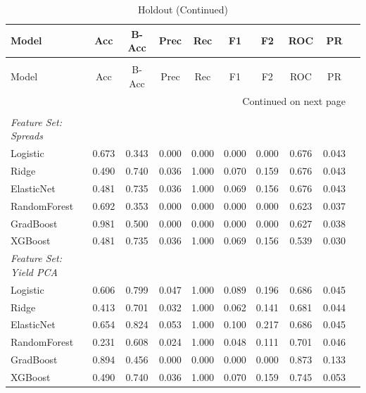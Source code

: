 \begin{longtable}{lccccccccc}
\caption{Holdout Performance} \label{tab:h} \\
\toprule
Model & Acc & B-Acc & Prec & Rec & F1 & F2 & ROC & PR \\
\midrule
\endfirsthead

\caption[]{Holdout (Continued)} \\
\toprule
Model & Acc & B-Acc & Prec & Rec & F1 & F2 & ROC & PR \\
\midrule
\endhead

\midrule
\multicolumn{9}{r}{Continued on next page} \\
\bottomrule
\endfoot
\bottomrule
\endlastfoot

\multicolumn{9}{l}{\textbf{Test Fraction: 0.200}} \\
\textit{Feature Set: Spreads} \\
\midrule
Logistic     & 0.673 & 0.343 & 0.000 & 0.000 & 0.000 & 0.000 & 0.676 & 0.043 \\
Ridge        & 0.490 & 0.740 & 0.036 & 1.000 & 0.070 & 0.159 & 0.676 & 0.043 \\
ElasticNet   & 0.481 & 0.735 & 0.036 & 1.000 & 0.069 & 0.156 & 0.676 & 0.043 \\
RandomForest & 0.692 & 0.353 & 0.000 & 0.000 & 0.000 & 0.000 & 0.623 & 0.037 \\
GradBoost    & 0.981 & 0.500 & 0.000 & 0.000 & 0.000 & 0.000 & 0.627 & 0.038 \\
XGBoost      & 0.481 & 0.735 & 0.036 & 1.000 & 0.069 & 0.156 & 0.539 & 0.030 \\
\addlinespace
\textit{Feature Set: Yield PCA} \\
\midrule
Logistic     & 0.606 & 0.799 & 0.047 & 1.000 & 0.089 & 0.196 & 0.686 & 0.045 \\
Ridge        & 0.413 & 0.701 & 0.032 & 1.000 & 0.062 & 0.141 & 0.681 & 0.044 \\
ElasticNet   & 0.654 & 0.824 & 0.053 & 1.000 & 0.100 & 0.217 & 0.686 & 0.045 \\
RandomForest & 0.231 & 0.608 & 0.024 & 1.000 & 0.048 & 0.111 & 0.701 & 0.046 \\
GradBoost    & 0.894 & 0.456 & 0.000 & 0.000 & 0.000 & 0.000 & 0.873 & 0.133 \\
XGBoost      & 0.490 & 0.740 & 0.036 & 1.000 & 0.070 & 0.159 & 0.745 & 0.053 \\


\end{longtable}
